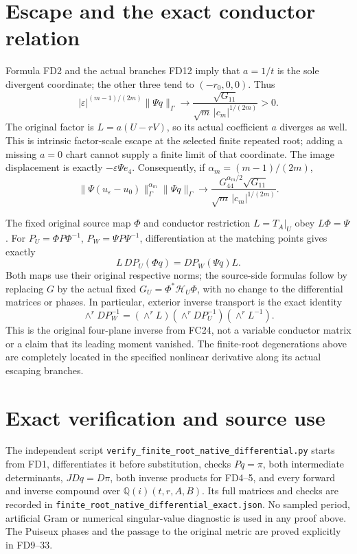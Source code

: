\documentclass[11pt]{article}
\begin{document}
\section{Escape and the exact conductor relation}
Formula FD2 and the actual branches FD12 imply that
\(a=1/t\) is the sole divergent coordinate; the other
three tend to \((-r_0,0,0)\). Thus
\[
 |\varepsilon|^{(m-1)/(2m)}\|\Psi q\|_\Gamma
 \longrightarrow\frac{\sqrt{G_{11}}}
                         {\sqrt m\,|c_m|^{1/(2m)}}>0.
 \tag{FD32}
\]
The original factor is \(L=a(U-rV)\), so its actual
coefficient \(a\) diverges as well. This is intrinsic
factor-scale escape at the selected finite repeated root;
adding a missing \(a=0\) chart cannot supply a finite
limit of that coordinate. The image displacement is
exactly \(-\varepsilon\Psi e_4\). Consequently, if
\(\alpha_m=(m-1)/(2m)\),
\[
 \|\Psi(u_\varepsilon-u_0)\|_\Gamma^{\alpha_m}
 \|\Psi q\|_\Gamma
 \longrightarrow
 \frac{G_{44}^{\alpha_m/2}\sqrt{G_{11}}}
                         {\sqrt m\,|c_m|^{1/(2m)}}.
 \tag{FD33}
\]

The fixed original source map \(\Phi\) and conductor
restriction \(L=T_A|_U\) obey \(L\Phi=\Psi\).
For \(P_U=\Phi P\Phi^{-1}\), \(P_W=\Psi P\Psi^{-1}\),
differentiation at the matching points gives exactly
\[
 L\,DP_U(\Phi q)=DP_W(\Psi q)L.
 \tag{FD34}
\]
Both maps use their original respective norms; the
source-side formulas follow by replacing \(G\) by
the actual fixed \(G_U=\Phi^*\mathcal H_U\Phi\), with
no change to the differential matrices or phases.
In particular, exterior inverse transport is the exact
identity
\[
 \wedge^r DP_W^{-1}
   =(\wedge^rL)(\wedge^rDP_U^{-1})(\wedge^rL^{-1}).
 \tag{FD35}
\]
This is the original four-plane inverse from FC24, not
a variable conductor matrix or a claim that its leading
moment vanished. The finite-root degenerations above
are completely located in the specified nonlinear
derivative along its actual escaping branches.

\section{Exact verification and source use}
The independent script
\texttt{verify\_finite\_root\_native\_differential.py}
starts from FD1, differentiates it before substitution,
checks \(Pq=\pi\), both intermediate determinants,
\(JDq=D\pi\), both inverse products for FD4--5,
and every forward and inverse compound over
\(\mathbb Q(i)(t,r,A,B)\). Its full matrices and checks
are recorded in
\texttt{finite\_root\_native\_differential\_exact.json}.
No sampled period, artificial Gram or numerical
singular-value diagnostic is used in any proof above.
The Puiseux phases and the passage to the original metric
are proved explicitly in FD9--33.
\end{document}
